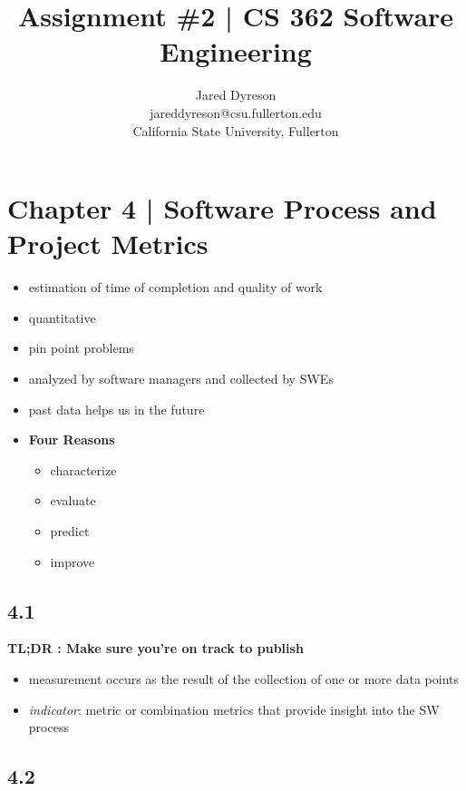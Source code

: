 \documentclass{article}
\title{Assignment \#2 | CS 362 Software Engineering}
\author{Jared Dyreson \\
        jareddyreson@csu.fullerton.edu \\
        California State University, Fullerton}
\date
\begin{document}
\maketitle
\tableofcontents

\newpage

\section{Chapter 4 | Software Process and Project Metrics}

\begin{itemize}
\item estimation of time of completion and quality of work
\item quantitative
\item pin point problems
\item analyzed by software managers and collected by SWEs
\item past data helps us in the future
\item \textbf{Four Reasons}
\begin{itemize}
\item characterize
\item evaluate
\item predict
\item improve
\end{itemize}
\end{itemize}

\subsection{4.1}

\textbf{TL;DR : Make sure you're on track to publish}

\begin{itemize}
\item measurement occurs  as the result of the collection of one or more data points
\item \emph{indicator}: metric or combination metrics that provide insight into the SW process
\end{itemize}

\newpage

\subsection{4.2}
\end{document}
